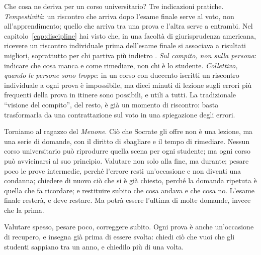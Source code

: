 Che cosa ne deriva per un corso universitario? Tre indicazioni
pratiche. \emph{Tempestività}: un riscontro che arriva dopo
l'esame finale serve al voto, non all'apprendimento; quello che
arriva tra una prova e l'altra serve a entrambi. Nel
capitolo~\ref{cap:discipline} hai visto che, in una facoltà di
giurisprudenza americana, ricevere un riscontro individuale prima
dell'esame finale si associava a risultati migliori, soprattutto per
chi partiva più indietro \parencite{schwarcz2017}. \emph{Sul compito,
non sulla persona}: indicare che cosa manca e come rimediare, non chi
è lo studente. \emph{Collettivo, quando le persone sono troppe}: in un
corso con duecento iscritti un riscontro individuale a ogni prova è
impossibile, ma dieci minuti di lezione sugli errori più frequenti
della prova in itinere sono possibili, e utili a tutti. La
tradizionale \enquote{visione del compito}, del resto, è già un
momento di riscontro: basta trasformarla da una contrattazione sul
voto in una spiegazione degli errori.

\asterismo

Torniamo al ragazzo del \emph{Menone}. Ciò che Socrate gli offre non è
una lezione, ma una serie di domande, con il diritto di sbagliare e il
tempo di rimediare. Nessun corso universitario può riprodurre quella
scena per ogni studente; ma ogni corso può avvicinarsi al suo
principio. Valutare non solo alla fine, ma durante; pesare poco le
prove intermedie, perché l'errore resti un'occasione e non diventi una
condanna; chiedere di nuovo ciò che si è già chiesto, perché la
domanda ripetuta è quella che fa ricordare; e restituire subito che
cosa andava e che cosa no. L'esame finale resterà, e deve restare. Ma
potrà essere l'ultima di molte domande, invece che la prima.

\begin{daricordare}
Valutare spesso, pesare poco, correggere subito. Ogni prova è anche
un'occasione di recupero, e insegna già prima di essere svolta:
chiedi ciò che vuoi che gli studenti sappiano tra un anno, e chiedilo
più di una volta.
\end{daricordare}

